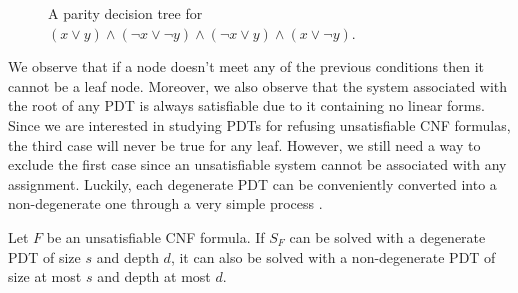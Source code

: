 \begin{figure}[H]
    \centering


    \caption{A parity decision tree for $(x \lor y) \land (\lnot x \lor \lnot y) \land (\lnot x \lor y) \land (x \lor \lnot y)$.}
\end{figure}

We observe that if a node doesn't meet any of the previous conditions then it cannot be a leaf node. Moreover, we also observe that the system associated with the root of any PDT is always satisfiable due to it containing no linear forms. Since we are interested in studying PDTs for refusing unsatisfiable CNF formulas, the third case will never be true for any leaf. However, we still need a way to exclude the first case since an unsatisfiable system cannot be associated with any assignment. Luckily, each degenerate PDT can be conveniently converted into a non-degenerate one through a very simple process \cite{res_lin_2}.

\begin{proposition}
    \label{degenerate}
 Let $F$ be an unsatisfiable CNF formula. If $S_F$ can be solved with a degenerate PDT of size $s$ and depth $d$, it can also be solved with a non-degenerate PDT of size at most $s$ and depth at most $d$.
\end{proposition}

